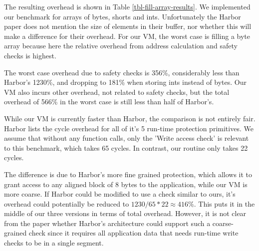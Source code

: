 The resulting overhead is shown in Table \ref{tbl-fill-array-results}. We implemented our benchmark for arrays of bytes, shorts and ints. Unfortunately the Harbor paper does not mention the size of elements in their buffer, nor whether this will make a difference for their overhead. For our VM, the worst case is filling a byte array because here the relative overhead from address calculation and safety checks is highest.

The worst case overhead due to safety checks is 356\%, considerably less than Harbor's 1230\%, and dropping to 181\% when storing ints instead of bytes. Our VM also incurs other overhead, not related to safety checks, but the total overhead of 566\% in the worst case is still less than half of Harbor's.

While our VM is currently faster than Harbor, the comparison is not entirely fair. Harbor lists the cycle overhead for all of it's 5 run-time protection primitives. We assume that without any function calls, only the 'Write access check' is relevant to this benchmark, which takes 65 cycles. In contrast, our  routine only takes 22 cycles.

The difference is due to Harbor's more fine grained protection, which allows it to grant access to any aligned block of 8 bytes to the application, while our VM is more coarse. If Harbor could be modified to use a check similar to ours, it's overhead could potentially be reduced to $1230 / 65 * 22 \approx 416\%$. This puts it in the middle of our three versions in terms of total overhead. However, it is not clear from the paper whether Harbor's architecture could support such a coarse-grained check since it requires all application data that needs run-time write checks to be in a single segment.



